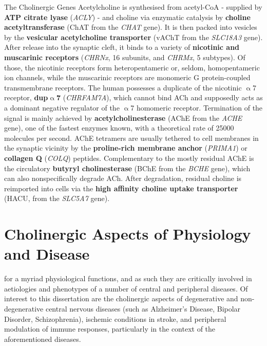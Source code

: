 \begin{mybox}{The Cholinergic Genes}\label{box:chol-genes}
Acetylcholine is synthesised from acetyl-CoA - supplied by \textbf{ATP citrate lyase} (\emph{ACLY}) - and choline via enzymatic catalysis by \textbf{choline acetyltransferase} (ChAT from the \emph{CHAT} gene). It is then packed into vesicles by the \textbf{vesicular acetylcholine transporter} (vAChT from the \emph{SLC18A3} gene). After release into the synaptic cleft, it binds to a variety of \textbf{nicotinic and muscarinic receptors} (\emph{CHRNx}, 16 subunits, and \emph{CHRMx}, 5 subtypes). Of those, the nicotinic receptors form heteropentameric or, seldom, homopentameric ion channels, while the muscarinic receptors are monomeric G protein-coupled transmembrane receptors. The human possesses a duplicate of the nicotinic $\upalpha$7 receptor, \textbf{dup$\upalpha$7} (\emph{CHRFAM7A}), which cannot bind ACh and supposedly acts as a dominant negative regulator of the $\upalpha$7 homomeric receptor. Termination of the signal is mainly achieved by \textbf{acetylcholinesterase} (AChE from the \emph{ACHE} gene), one of the fastest enzymes known, with a theoretical rate of \num{25000} molecules per second. AChE tetramers are usually tethered to cell membranes in the synaptic vicinity by the \textbf{proline-rich membrane anchor} (\emph{PRIMA1}) or \textbf{collagen Q} (\emph{COLQ}) peptides. Complementary to the mostly residual AChE is the circulatory \textbf{butyryl cholinesterase} (BChE from the \emph{BCHE} gene), which can also nonspecifically degrade ACh. After degradation, residual choline is reimported into cells via the \textbf{high affinity choline uptake transporter} (HACU, from the \emph{SLC5A7} gene).
\end{mybox}

\section{Cholinergic Aspects of Physiology and Disease} \label{sec:intro:diseases}
 for a myriad physiological functions, and as such they are critically involved in aetiologies and phenotypes of a number of central and peripheral diseases. Of interest to this dissertation are the cholinergic aspects of degenerative and non-degenerative central nervous diseases (such as Alzheimer's Disease, Bipolar Disorder, Schizophrenia), ischemic conditions in stroke, and peripheral modulation of immune responses, particularly in the context of the aforementioned diseases.

